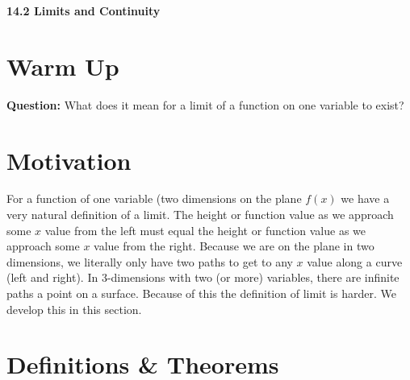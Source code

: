 \documentclass[11pt]{article}
\newcommand{\vs}{\vspace*{.1in}}
\begin{document}
\begin{LARGE}\begin{center}\bf 14.2 Limits and Continuity\end{center}
\end{LARGE}

\vs\vs



\section{Warm Up}
\textbf{Question:} What does it mean for a limit of a function on one variable to exist?



\section{Motivation}
For a function of one variable (two dimensions on the plane $f(x)$ we have a very natural definition of a limit. The height or function value as we approach some $x$ value from the left must equal the height or function value as we approach some $x$ value from the right. Because we are on the plane in two dimensions, we literally only have two paths to get to any $x$ value along a curve (left and right). In 3-dimensions with two (or more) variables, there are infinite paths a point on a surface. Because of this the definition of limit is harder. We develop this in this section.



\section{Definitions \& Theorems}
\end{document}
